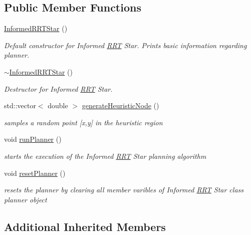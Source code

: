 \subsection*{Public Member Functions}
\begin{DoxyCompactItemize}
\item 
\hyperlink{classInformedRRTStar_a4d5570b65e11a71d7ab132836eab25a5}{Informed\+R\+R\+T\+Star} ()
\begin{DoxyCompactList}\small\item\em Default constructor for Informed \hyperlink{classRRT}{R\+RT} Star. Prints basic information regarding planner. \end{DoxyCompactList}\item 
\hyperlink{classInformedRRTStar_a85971b0ff627946cb05f235e03b6a3f1}{$\sim$\+Informed\+R\+R\+T\+Star} ()
\begin{DoxyCompactList}\small\item\em Destructor for Informed \hyperlink{classRRT}{R\+RT} Star. \end{DoxyCompactList}\item 
std\+::vector$<$ double $>$ \hyperlink{classInformedRRTStar_a19d619bb1f106dbd36674a545e82a2b3}{generate\+Heuristic\+Node} ()
\begin{DoxyCompactList}\small\item\em samples a random point \mbox{[}x,y\mbox{]} in the heuristic region \end{DoxyCompactList}\item 
void \hyperlink{classInformedRRTStar_afbd7ccc52e9d6dfe734ffcb1bc386234}{run\+Planner} ()
\begin{DoxyCompactList}\small\item\em starts the execution of the Informed \hyperlink{classRRT}{R\+RT} Star planning algorithm \end{DoxyCompactList}\item 
void \hyperlink{classInformedRRTStar_ac13574a2c2a765599ef42283b069a471}{reset\+Planner} ()
\begin{DoxyCompactList}\small\item\em resets the planner by clearing all member varibles of Informed \hyperlink{classRRT}{R\+RT} Star class planner object \end{DoxyCompactList}\end{DoxyCompactItemize}
\subsection*{Additional Inherited Members}


